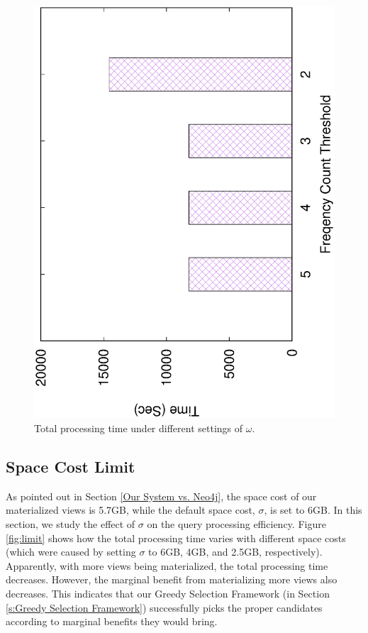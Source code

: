 	\begin{figure}[H]
		\centering
		\includegraphics[scale=0.5, angle=270]{plot/omega.eps}
		\caption{Total processing time under different settings of $\omega$.}
		\label{fig:omega}
	\end{figure}
	
	
	\subsection{Space Cost Limit}
	\label{Space Cost Limit}
	As pointed out in Section \ref{Our System vs. Neo4j}, the space cost of our materialized views is 5.7GB, while the default space cost, $\sigma$, is set to 6GB. In this section, we study the effect of $\sigma$ on the query processing efficiency.  Figure \ref{fig:limit} shows how the total processing time varies with different space costs (which were caused by setting $\sigma$ to 6GB, 4GB, and 2.5GB, respectively). Apparently,  with more views being materialized, the total processing time decreases. However, the marginal benefit from materializing more views also decreases. This indicates that our Greedy Selection Framework (in Section \ref{s:Greedy Selection Framework}) successfully picks the proper candidates according to marginal benefits they would bring.
	
